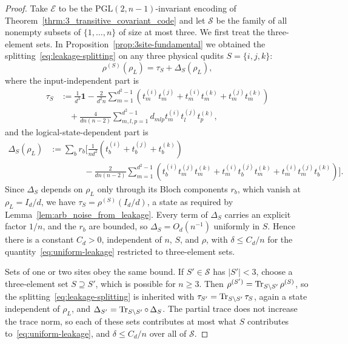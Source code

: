 \documentclass[11pt,letterpaper]{article}
\theoremstyle{plain}
\theoremstyle{plain}
\theoremstyle{plain}
\theoremstyle{plain}
\theoremstyle{plain}
\theoremstyle{plain}
\theoremstyle{plain}
\theoremstyle{definition}
\theoremstyle{plain}
\begin{document}
\begin{proof}
    Take $\mathcal E$ to be the $\mathrm{PGL}(2,n-1)$-invariant encoding of Theorem~\ref{thrm:3_transitive_covariant_code} and let $\mathcal S$ 
    be the family of all nonempty subsets of $\{1,\ldots,n\}$ of size at most three. We first treat the three-element sets. 
    In Proposition~\ref{prop:3site-fundamental} we obtained the splitting~\eqref{eq:leakage-splitting} on any three physical qudits \(S=\{i,j,k\}\):
    \[
        \rho^{(S)}(\rho_L)
        =
        \tau_S+\Delta_S(\rho_L),
    \]
    where the input-independent part is
    \[
    \begin{aligned}
        \tau_S
        &:=
        \frac{1}{d^3}\mathbf 1
        -\frac{2}{d^2 n}
        \sum_{m=1}^{d^2-1}
        \left(
            t_m^{(i)}t_m^{(j)}
            +
            t_m^{(i)}t_m^{(k)}
            +
            t_m^{(j)}t_m^{(k)}
        \right)
        \\
        &\quad
        +
        \frac{4}{d n(n-2)}
        \sum_{m,l,p=1}^{d^2-1}
        d_{mlp}
        t_m^{(i)}t_l^{(j)}t_p^{(k)},
    \end{aligned}
    \]
    and the logical-state-dependent part is
    \[
    \begin{aligned}
        \Delta_S(\rho_L)
        &:=
        \sum_b r_b
        \Bigg[
        \frac{1}{n d^2}
        \left(
            t_b^{(i)}+t_b^{(j)}+t_b^{(k)}
        \right)
        \\
        &\qquad\qquad
        -
        \frac{2}{d n(n-2)}
        \sum_{m=1}^{d^2-1}
        \left(
            t_b^{(i)}t_m^{(j)}t_m^{(k)}
            +
            t_m^{(i)}t_b^{(j)}t_m^{(k)}
            +
            t_m^{(i)}t_m^{(j)}t_b^{(k)}
        \right)
        \Bigg].
    \end{aligned}
    \]
    Since $\Delta_S$ depends on $\rho_L$ only through its Bloch components $r_b$, which vanish at $\rho_L=I_d/d$, we have $\tau_S=\rho^{(S)}(I_d/d)$, a state as required by Lemma~\ref{lem:arb_noise_from_leakage}. 
    Every term of $\Delta_S$ carries an explicit factor $1/n$, and the $r_b$ are bounded, so \(\Delta_S=O_{d}(n^{-1})\) uniformly in \(S\). 
    Hence there is a constant \(C_d>0\), independent of \(n\), \(S\), and \(\rho\), with $\delta\le C_d/n$ for the quantity~\eqref{eq:uniform-leakage} restricted to three-element sets.

    Sets of one or two sites obey the same bound.  If $S'\in\mathcal S$ has $|S'|<3$, choose a three-element set $S\supseteq S'$, which is possible for $n\ge3$. 
    Then $\rho^{(S')}=\Tr_{S\setminus S'}\rho^{(S)}$, so the splitting~\eqref{eq:leakage-splitting} is inherited with $\tau_{S'}=\Tr_{S\setminus S'}\tau_S$, again a state independent of $\rho_L$, and $\Delta_{S'}=\Tr_{S\setminus S'}\circ\,\Delta_S$.
    The partial trace does not increase the trace norm, so each of these sets contributes at most what $S$ contributes to~\eqref{eq:uniform-leakage}, and $\delta\le C_d/n$ over all of $\mathcal S$.


\end{proof}
\end{document}
